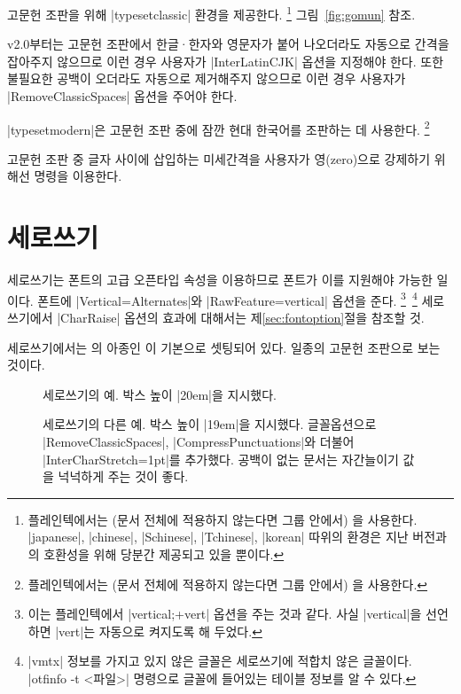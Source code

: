 \documentclass[a4paper]{article}
\def\luatex{\hologo{LuaTeX}}
\def\logoko{\textsf{k}\kern-.0625em\textit{o}}
\def\luatexko{\luatex-\logoko}
\begin{document}
고문헌 조판을 위해 |typesetclassic| 환경을 제공한다.%
\footnote{%
  플레인텍에서는 (문서 전체에 적용하지 않는다면 그룹 안에서)
  을 사용한다.
  |japanese|, |chinese|, |Schinese|, |Tchinese|, |korean| 따위의 환경은
  지난 버전과의 호환성을 위해 당분간 제공되고 있을 뿐이다. }
그림~\ref{fig:gomun} 참조.

v2.0부터는 고문헌 조판에서 한글^^b7한자와 영문자가 붙어 나오더라도 자동으로
간격을 잡아주지 않으므로 이런 경우 사용자가 |InterLatinCJK| 옵션을
지정해야 한다.
또한 불필요한 공백이 오더라도 자동으로 제거해주지 않으므로 이런 경우
사용자가 |RemoveClassicSpaces| 옵션을 주어야 한다.

|typesetmodern|은 고문헌 조판 중에 잠깐 현대 한국어를 조판하는 데 사용한다.%
\footnote{%
  플레인텍에서는 (문서 전체에 적용하지 않는다면 그룹 안에서)
  을 사용한다. }

고문헌 조판 중  글자 사이에 삽입하는 미세간격을
사용자가 영{\small(zero)}으로 강제하기 위해선  명령을 이용한다.

\section{세로쓰기}\label{sec:verttype}

세로쓰기는 폰트의 고급 오픈타입 속성을 이용하므로 폰트가 이를 지원해야
가능한 일이다. 폰트에 |Vertical=Alternates|와 |RawFeature=vertical| 옵션을
준다.%
\footnote{%
  이는 플레인텍에서 |vertical;+vert| 옵션을 주는 것과 같다.
  사실 |vertical|을 선언하면 |vert|는 자동으로 켜지도록 해 두었다. }\,%
\footnote{%
  |vmtx| 정보를 가지고 있지 않은 글꼴은 세로쓰기에 적합치 않은 글꼴이다.
  |otfinfo -t <파일>| 명령으로 글꼴에 들어있는 테이블 정보를 알 수 있다. }
세로쓰기에서 |CharRaise| 옵션의 효과에 대해서는 제\ref{sec:fontoption}절을
참조할 것.

세로쓰기에서는 의 아종인 이
기본으로 셋팅되어 있다. 일종의 고문헌 조판으로 보는 것이다.

\begin{figure}
\caption{세로쓰기의 예. 박스 높이 |20em|을 지시했다.}\label{fig:vertical}
\end{figure}

\begin{figure}
\caption{세로쓰기의 다른 예. 박스 높이 |19em|을 지시했다.
  글꼴옵션으로 |RemoveClassicSpaces|, |CompressPunctuations|와 더불어
  |InterCharStretch=1pt|를 추가했다. 공백이 없는 문서는 자간늘이기 값을
  넉넉하게 주는 것이 좋다.}\label{fig:vertical3}
\end{figure}
\end{document}
